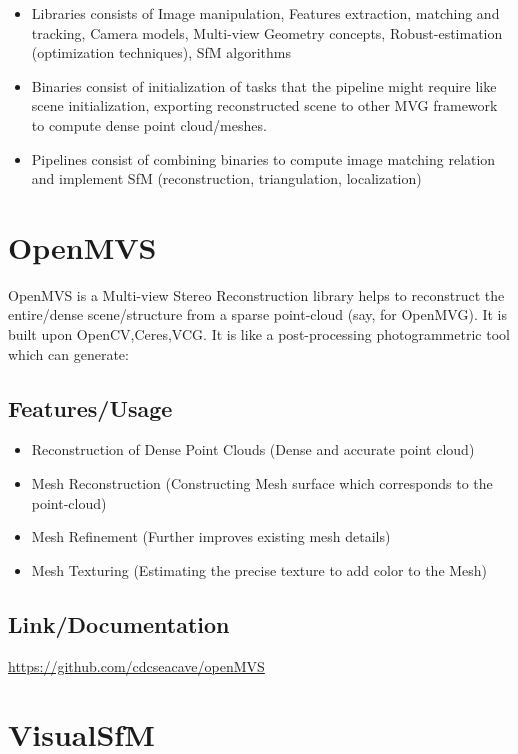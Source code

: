\documentclass{article}[11pt]
\begin{document}
\begin{itemize}
    \item Libraries consists of Image manipulation, Features extraction, matching and tracking, Camera models, Multi-view Geometry concepts, Robust-estimation (optimization techniques), SfM algorithms
    \item Binaries consist of initialization of tasks that the pipeline might require like scene initialization, exporting reconstructed scene to other MVG framework to compute dense point cloud/meshes.
    \item Pipelines consist of combining binaries to compute image matching relation and implement SfM (reconstruction, triangulation, localization)   
\end{itemize}


\section{OpenMVS}


OpenMVS is a Multi-view Stereo Reconstruction library helps to reconstruct the entire/dense scene/structure from a sparse point-cloud (say, for OpenMVG). It is built upon OpenCV,Ceres,VCG. It is like a post-processing photogrammetric tool which can generate:

\subsection{Features/Usage}

\begin{itemize}
    \item Reconstruction of Dense Point Clouds (Dense and accurate point cloud)
    \item Mesh Reconstruction (Constructing Mesh surface which corresponds to the point-cloud)
    \item Mesh Refinement (Further improves existing mesh details)
    \item Mesh Texturing (Estimating the precise texture to add color to the Mesh)
\end{itemize}

\subsection{Link/Documentation}
\url{https://github.com/cdcseacave/openMVS}

\section{VisualSfM}
\end{document}
